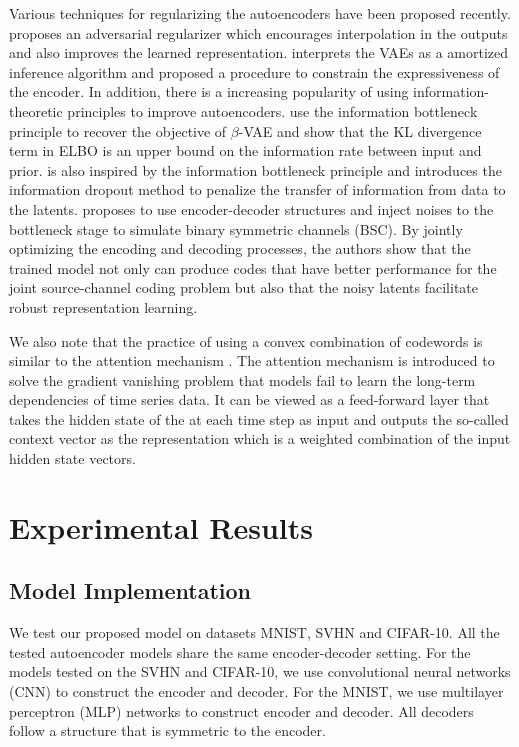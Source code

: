 \documentclass[letterpaper]{article} %
\begin{document}
Various techniques for regularizing the autoencoders have been proposed recently. \cite{DBLP:journals/corr/abs-1807-07543} proposes an adversarial regularizer which encourages interpolation in the outputs and also improves the learned representation. \cite{NIPS2018_7692} interprets the VAEs as a amortized inference algorithm and proposed a procedure to constrain the expressiveness of the encoder. In addition, there is a increasing popularity of using information-theoretic principles to improve autoencoders. \cite{alemi:17:iclr}\cite{pmlr-v80-alemi18a} use the information bottleneck principle \cite{tishby:15:itw} to recover the objective of $\beta$-VAE and show that the KL divergence term in ELBO is an upper bound on the information rate between input and prior. \cite{8253482} is also inspired by the information bottleneck principle and  introduces the information dropout method to penalize the transfer of information from data to the latents. \cite{DBLP:journals/corr/abs-1811-07557} proposes to use encoder-decoder structures and inject noises to the bottleneck stage to simulate binary symmetric channels (BSC). By jointly optimizing the encoding and decoding processes, the authors show that the trained model not only can produce codes that have better performance for the joint source-channel coding problem but also that the noisy latents facilitate robust representation learning.

We also note that the practice of using a convex combination of codewords is similar to the attention mechanism \cite{NIPS2017_7181}. The attention mechanism is introduced to solve the gradient vanishing problem that models fail to learn the long-term dependencies of time series data. It can be viewed as a feed-forward layer that takes the hidden state of the at each time step as input and outputs the so-called context vector as the representation which is a weighted combination of the input hidden state vectors. 
\section{Experimental Results}
\subsection{Model Implementation}
We test our proposed model on datasets MNIST, SVHN and CIFAR-10. All the tested autoencoder models share the same encoder-decoder setting. For the models tested on the SVHN and CIFAR-10, we use convolutional neural networks (CNN) to construct the encoder and decoder. For the MNIST, we use multilayer perceptron (MLP) networks to construct encoder and decoder. All decoders follow a structure that is symmetric to the encoder.
\end{document}
